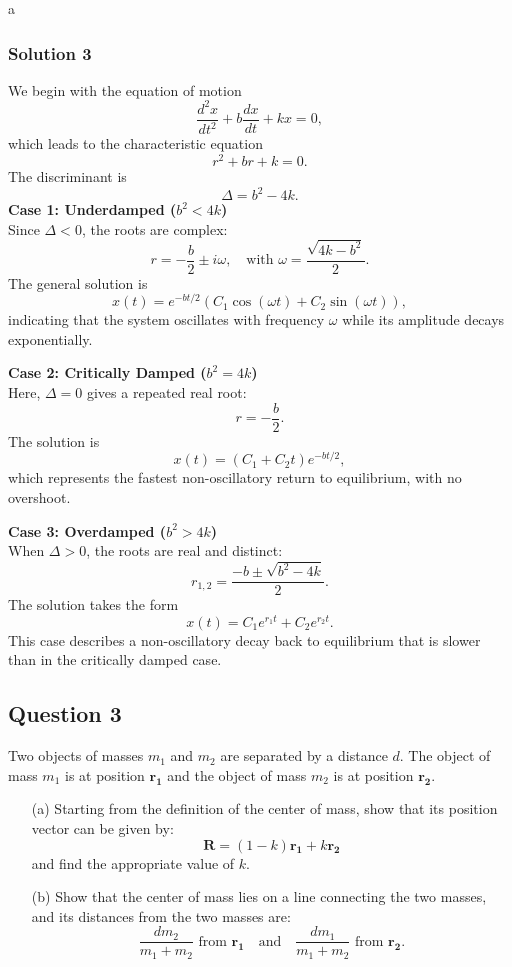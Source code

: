 \documentclass{article}
\begin{document}
a\subsubsection{Solution 3}
We begin with the equation of motion
\[
\frac{d^2x}{dt^2} + b\frac{dx}{dt} + kx = 0,
\]
which leads to the characteristic equation
\[
r^2 + br + k = 0.
\]
The discriminant is
\[
\Delta = b^2 - 4k.
\]
\textbf{Case 1: Underdamped ($b^2 < 4k$)} \\
Since \(\Delta < 0\), the roots are complex:
\[
r = -\frac{b}{2} \pm i\omega,\quad \text{with } \omega = \frac{\sqrt{4k - b^2}}{2}.
\]
The general solution is
\[
x(t) = e^{-bt/2}\left(C_1\cos(\omega t) + C_2\sin(\omega t)\right),
\]
indicating that the system oscillates with frequency \(\omega\) while its amplitude decays exponentially.

\medskip

\textbf{Case 2: Critically Damped ($b^2 = 4k$)} \\
Here, \(\Delta = 0\) gives a repeated real root:
\[
r = -\frac{b}{2}.
\]
The solution is
\[
x(t) = (C_1 + C_2 t)e^{-bt/2},
\]
which represents the fastest non-oscillatory return to equilibrium, with no overshoot.

\medskip

\textbf{Case 3: Overdamped ($b^2 > 4k$)} \\
When \(\Delta > 0\), the roots are real and distinct:
\[
r_{1,2} = \frac{-b \pm \sqrt{b^2 - 4k}}{2}.
\]
The solution takes the form
\[
x(t) = C_1 e^{r_1t} + C_2 e^{r_2t}.
\]
This case describes a non-oscillatory decay back to equilibrium that is slower than in the critically damped case.


\subsection{Question 3}

Two objects of masses $m_1$ and $m_2$ are separated by a distance $d$. The object of mass $m_1$ is at position $\mathbf{r_1}$ and the object of mass $m_2$ is at position $\mathbf{r_2}$.

\begin{itemize}
    \item[(a)] Starting from the definition of the center of mass, show that its position vector can be given by:
    \[
    \mathbf{R} = (1 - k)\mathbf{r_1} + k\mathbf{r_2}
    \]
    and find the appropriate value of $k$.
    
    \item[(b)] Show that the center of mass lies on a line connecting the two masses, and its distances from the two masses are:
    \[
    \frac{dm_2}{m_1 + m_2} \text{ from } \mathbf{r_1} \quad \text{and} \quad \frac{dm_1}{m_1 + m_2} \text{ from } \mathbf{r_2}.
    \]
\end{itemize}
\end{document}

